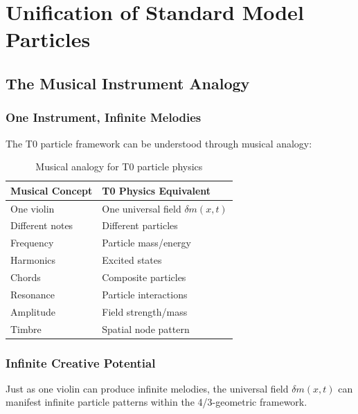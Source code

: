 	\section{Unification of Standard Model Particles}
	\label{sec:sm_unification}
	
	\subsection{The Musical Instrument Analogy}
	\label{subsec:musical_analogy}
	
	\subsubsection{One Instrument, Infinite Melodies}
	\label{subsubsec:one_instrument}
	
	The T0 particle framework can be understood through musical analogy:
	
	\begin{table}[htbp]
		\centering
		\begin{tabular}{ll}
			\toprule
			\textbf{Musical Concept} & \textbf{T0 Physics Equivalent} \\
			\midrule
			One violin & One universal field $\delta m(x,t)$ \\
			Different notes & Different particles \\
			Frequency & Particle mass/energy \\
			Harmonics & Excited states \\
			Chords & Composite particles \\
			Resonance & Particle interactions \\
			Amplitude & Field strength/mass \\
			Timbre & Spatial node pattern \\
			\bottomrule
		\end{tabular}
		\caption{Musical analogy for T0 particle physics}
		\label{tab:musical_analogy}
	\end{table}
	
	\subsubsection{Infinite Creative Potential}
	\label{subsubsec:infinite_potential}
	
	Just as one violin can produce infinite melodies, the universal field $\delta m(x,t)$ can manifest infinite particle patterns within the 4/3-geometric framework.
	
